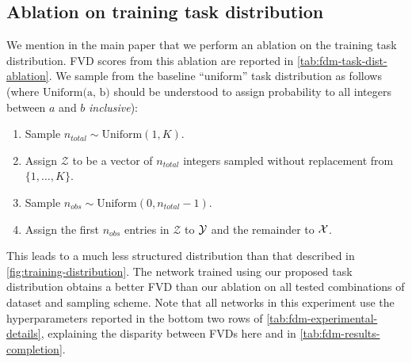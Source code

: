 \subsection{Ablation on training task distribution} \label{ap:fdm-training-task-distribution-ablation}
We mention in the main paper that we perform an ablation on the training task distribution. FVD scores from this ablation are reported in \cref{tab:fdm-task-dist-ablation}.
We sample from the baseline ``uniform'' task distribution as follows (where $\text{Uniform(a, b)}$ should be understood to assign probability to all integers between $a$ and $b$ \textit{inclusive}):
\begin{enumerate}
    \item Sample $n_{total} \sim \text{Uniform}(1, K)$.
    \item Assign $\mathcal{Z}$ to be a vector of $n_{total}$ integers sampled without replacement from $\{1,\ldots,K\}$.
    \item Sample $n_{obs} \sim \text{Uniform}(0, n_{total}-1)$.
    \item Assign the first $n_{obs}$ entries in $\mathcal{Z}$ to $\mathcal{Y}$ and the remainder to $\mathcal{X}$.
\end{enumerate}
This leads to a much less structured distribution than that described in \cref{fig:training-distribution}. The network trained using our proposed task distribution obtains a better FVD than our ablation on all tested combinations of dataset and sampling scheme. Note that all networks in this experiment use the hyperparameters reported in the bottom two rows of \cref{tab:fdm-experimental-details}, explaining the disparity between FVDs here and in \cref{tab:fdm-results-completion}.
